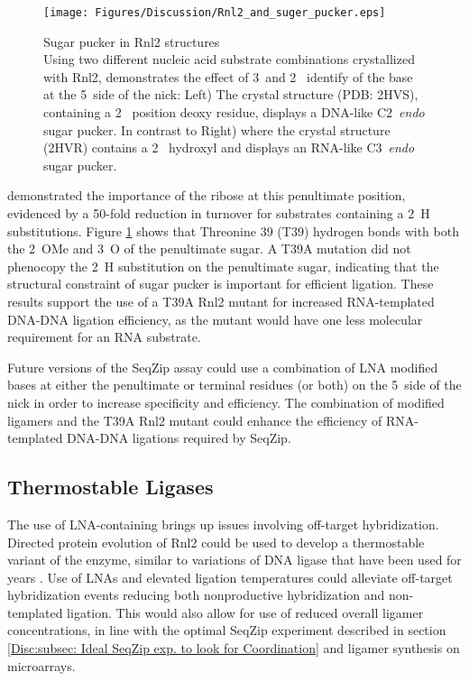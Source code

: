     \begin{figure} %
      \centering 
      \texttt{[image: Figures/Discussion/Rnl2\_and\_suger\_pucker.eps]}
      \caption[Sugar pucker in Rnl2 structures]
      {Sugar pucker in Rnl2 structures \\[0.25cm]
        Using two different nucleic acid substrate combinations crystallized with Rnl2, \citet{Nandakumar2006} demonstrates the effect of 3\textprime~and 2\textprime~ identify of the base at the 5\textprime~side of the nick: Left) The crystal structure (PDB: 2HVS), containing a 2\textprime~ position deoxy residue, displays a DNA-like C2\textprime~\textit{endo} sugar pucker. In contrast to Right) where the crystal structure (2HVR) contains a 2\textprime~ hydroxyl and displays an RNA-like C3\textprime~\textit{endo} sugar pucker.
        }
        \label{Disc:fig:Rnl2 and suger pucker}
        \end{figure}

    \citet{Nandakumar2004a} demonstrated the importance of the ribose at this penultimate position, evidenced by a 50-fold reduction in turnover for substrates containing a 2\textprime~H substitutions. Figure \ref{Disc:fig:Rnl2 and suger pucker} shows that Threonine 39 (T39) hydrogen bonds with both the 2\textprime~OMe and 3\textprime~O of the penultimate sugar. A T39A mutation did not phenocopy the 2\textprime~H substitution on the penultimate sugar, indicating that the structural constraint of sugar pucker is important for efficient ligation. These results support the use of a T39A Rnl2 mutant for increased RNA-templated DNA-DNA ligation efficiency, as the mutant would have one less molecular requirement for an RNA substrate.

    Future versions of the SeqZip assay could use a combination of LNA modified bases \citep{You2006} at either the penultimate or terminal residues (or both) on the 5\textprime~side of the nick in order to increase specificity and efficiency. The combination of modified ligamers and the T39A Rnl2 mutant could enhance the efficiency of RNA-templated DNA-DNA ligations required by SeqZip.

  \subsection{Thermostable Ligases}
    \label{Disc:subsec:Thermostable Ligases}

    The use of LNA-containing brings up issues involving off-target hybridization. Directed protein evolution of Rnl2 \citep{Stemmer1994, Romero2009a} could be used to develop a thermostable variant of the enzyme, similar to variations of DNA ligase that have been used for years \citep{Barany1991}. Use of LNAs and elevated ligation temperatures could alleviate off-target hybridization events reducing both nonproductive hybridization and non-templated ligation. This would also allow for use of reduced overall ligamer concentrations, in line with the optimal SeqZip experiment described in section \ref{Disc:subsec: Ideal SeqZip exp. to look for Coordination} and ligamer synthesis on microarrays.


